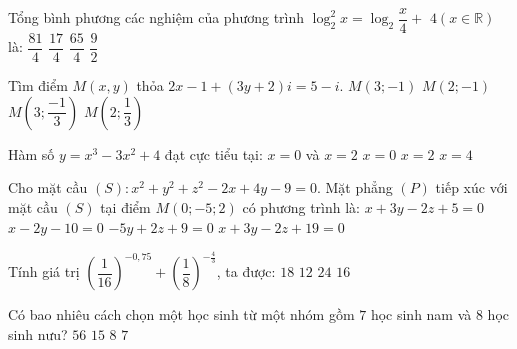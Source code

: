 \begin{ex}%
Tổng bình phương các nghiệm của phương trình $\log_2^2 x=\log_2 \dfrac{x}{4}+$ $4(x \in \mathbb{R})$ là:
\choice
{$\dfrac{81}{4}$}
{$\dfrac{17}{4}$}
{\True $\dfrac{65}{4}$}
{$\dfrac{9}{2}$}

\end{ex}
\begin{ex}%
Tìm điểm $M(x, y)$ thỏa $2 x-1+(3 y+2) i=5-i$.
\choice
{\True $M(3;-1)$}
{$M(2;-1)$}
{$M\left(3; \dfrac{-1}{3}\right)$}
{$M\left(2; \dfrac{1}{3}\right)$}

\end{ex}
\begin{ex}%
Hàm số $y=x^3-3 x^2+4$ đạt cực tiểu tại:
\choice
{$x=0$ và $x=2$}
{$x=0$}
{\True $x=2$}
{$x=4$}

\end{ex}

\begin{ex}%
Cho mặt cầu $(S)\colon x^2+y^2+z^2-2 x+4 y-9=0$. Mặt phẳng $(P)$ tiếp xúc với mặt cầu $(S)$ tại điểm $M(0;-5; 2)$ có phương trình là:
\choice
{$x+3 y-2 z+5=0$}
{$x-2 y-10=0$}
{$-5 y+2 z+9=0$}
{\True $x+3 y-2 z+19=0$}

\end{ex}
\begin{ex}%
Tính giá trị $\left(\dfrac{1}{16}\right)^{-0,75}+\left(\dfrac{1}{8}\right)^{-\frac{4}{3}}$, ta được:
\choice
{$18$}
{$12$}
{\True $24$}
{$16$}

\end{ex}

\begin{ex}%
Có bao nhiêu cách chọn một học sinh từ một nhóm gồm $7$ học sinh nam và $8$ học sinh nưu?
\choice
{$56$}
{\True $15$}
{$8$}
{$7$}

\end{ex}

